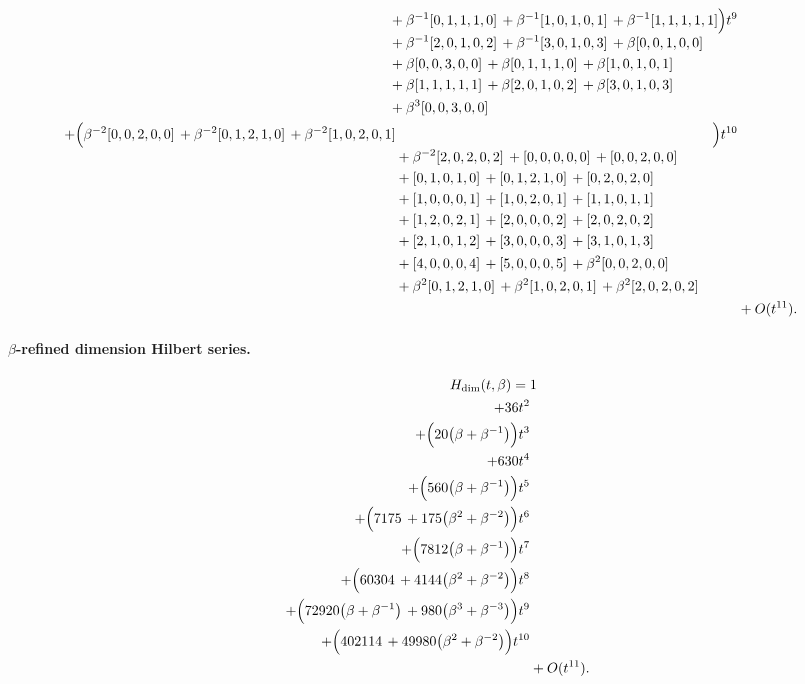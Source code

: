 \documentclass[10pt]{article}
\begin{document}
\[\begin{aligned}
\begin{aligned}[t]
  &{}+\beta^{-1}[0,1,1,1,0]\,+\beta^{-1}[1,0,1,0,1]\,+\beta^{-1}[1,1,1,1,1] \\
  &{}+\beta^{-1}[2,0,1,0,2]\,+\beta^{-1}[3,0,1,0,3]\,+\beta[0,0,1,0,0] \\
  &{}+\beta[0,0,3,0,0]\,+\beta[0,1,1,1,0]\,+\beta[1,0,1,0,1] \\
  &{}+\beta[1,1,1,1,1]\,+\beta[2,0,1,0,2]\,+\beta[3,0,1,0,3] \\
  &{}+\beta^{3}[0,0,3,0,0]\end{aligned}\Bigr)t^{9} \\
  + \Bigl(\begin{aligned}[t]\beta^{-2}[0,0,2,0,0]\,+\beta^{-2}[0,1,2,1,0]\,+\beta^{-2}[1,0,2,0,1] \\
  &{}+\beta^{-2}[2,0,2,0,2]\,+[0,0,0,0,0]\,+[0,0,2,0,0] \\
  &{}+[0,1,0,1,0]\,+[0,1,2,1,0]\,+[0,2,0,2,0] \\
  &{}+[1,0,0,0,1]\,+[1,0,2,0,1]\,+[1,1,0,1,1] \\
  &{}+[1,2,0,2,1]\,+[2,0,0,0,2]\,+[2,0,2,0,2] \\
  &{}+[2,1,0,1,2]\,+[3,0,0,0,3]\,+[3,1,0,1,3] \\
  &{}+[4,0,0,0,4]\,+[5,0,0,0,5]\,+\beta^{2}[0,0,2,0,0] \\
  &{}+\beta^{2}[0,1,2,1,0]\,+\beta^{2}[1,0,2,0,1]\,+\beta^{2}[2,0,2,0,2]\end{aligned}\Bigr)t^{10} \\
  &+ O(t^{11}).
\end{aligned}
\]
\paragraph{$\beta$-refined dimension Hilbert series.}
\[
\begin{aligned}
H_{\mathrm{dim}}(t,\beta) ={}&
   1 \\
  + 36t^{2} \\
  + \Bigl(20\bigl(\beta+\beta^{-1}\bigr)\Bigr)t^{3} \\
  + 630t^{4} \\
  + \Bigl(560\bigl(\beta+\beta^{-1}\bigr)\Bigr)t^{5} \\
  + \Bigl(7175\,+175\bigl(\beta^{2}+\beta^{-2}\bigr)\Bigr)t^{6} \\
  + \Bigl(7812\bigl(\beta+\beta^{-1}\bigr)\Bigr)t^{7} \\
  + \Bigl(60304\,+4144\bigl(\beta^{2}+\beta^{-2}\bigr)\Bigr)t^{8} \\
  + \Bigl(72920\bigl(\beta+\beta^{-1}\bigr)\,+980\bigl(\beta^{3}+\beta^{-3}\bigr)\Bigr)t^{9} \\
  + \Bigl(402114\,+49980\bigl(\beta^{2}+\beta^{-2}\bigr)\Bigr)t^{10} \\
  &+ O(t^{11}).
\end{aligned}
\]
\end{document}
